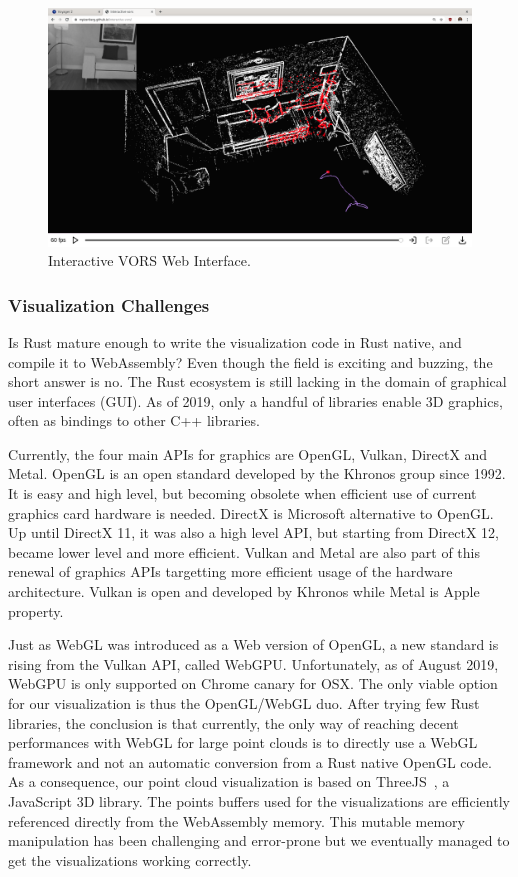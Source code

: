 \begin{figure}[ht]
	\centering
	\includegraphics[width=\linewidth]{assets/img/interactive-vors.png}
	\caption{Interactive VORS Web Interface.}%
	\label{fig:interactive-vors-interface}
\end{figure}

\subsubsection{Visualization Challenges}%

Is Rust mature enough to write the visualization code in Rust native,
and compile it to WebAssembly?
Even though the field is exciting and buzzing, the short answer is no.
The Rust ecosystem is still lacking in the domain of graphical user interfaces (GUI).
As of 2019, only a handful of libraries enable 3D graphics,
often as bindings to other C++ libraries.

Currently, the four main APIs for graphics are OpenGL, Vulkan, DirectX and Metal.
OpenGL is an open standard developed by the Khronos group since 1992.
It is easy and high level, but becoming obsolete
when efficient use of current graphics card hardware is needed.
DirectX is Microsoft alternative to OpenGL.\@
Up until DirectX 11, it was also a high level API,
but starting from DirectX 12, became lower level and more efficient.
Vulkan and Metal are also part of this renewal of graphics APIs
targetting more efficient usage of the hardware architecture.
Vulkan is open and developed by Khronos while Metal is Apple property.

Just as WebGL was introduced as a Web version of OpenGL,
a new standard is rising from the Vulkan API, called WebGPU.\@
Unfortunately, as of August 2019, WebGPU is only supported on Chrome canary for OSX.\@
The only viable option for our visualization is thus the OpenGL/WebGL duo.\@
After trying few Rust libraries, the conclusion is that currently,
the only way of reaching decent performances with WebGL for large point clouds
is to directly use a WebGL framework
and not an automatic conversion from a Rust native OpenGL code.
As a consequence, our point cloud visualization is based on ThreeJS~\cite{threejs},
a JavaScript 3D library.
The points buffers used for the visualizations are efficiently referenced
directly from the WebAssembly memory.
This mutable memory manipulation has been challenging and error-prone
but we eventually managed to get the visualizations working correctly.

